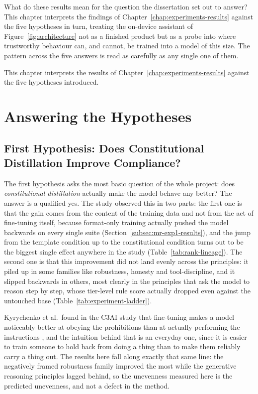 What do these results mean for the question the dissertation set out to answer? This chapter interprets the findings of Chapter~\ref{chap:experiments-results} against the five hypotheses in turn, treating the on-device assistant of Figure~\ref{fig:architecture} not as a finished product but as a probe into where trustworthy behaviour can, and cannot, be trained into a model of this size. The pattern across the five answers is read as carefully as any single one of them.

This chapter interprets the results of Chapter~\ref{chap:experiments-results} against the five hypotheses introduced.

\section{Answering the Hypotheses}
\label{sec:answering-hypotheses}

\subsection{First Hypothesis: Does Constitutional Distillation Improve Compliance?}
\label{subsec:h1-constitutional-distillation}

The first hypothesis asks the most basic question of the whole project: does \emph{constitutional distillation} actually make the model behave any better? The answer is a qualified yes. The study observed this in two parts: the first one is that the gain comes from the content of the training data and not from the act of fine-tuning itself, because format-only training actually pushed the model backwards on every single suite (Section~\ref{subsec:mr-exp1-results}), and the jump from the template condition up to the constitutional condition turns out to be the biggest single effect anywhere in the study (Table~\ref{tab:rank-lineage}). The second one is that this improvement did not land evenly across the principles: it piled up in some families like robustness, honesty and tool-discipline, and it slipped backwards in others, most clearly in the principles that ask the model to reason step by step, whose tier-level rule score actually dropped even against the untouched base (Table~\ref{tab:experiment-ladder}). 

Kyrychenko et al.\ found in the C3AI study that fine-tuning makes a model noticeably better at obeying the prohibitions than at actually performing the instructions \cite{kyrychenko2025c3aicraftingevaluatingconstitutions}, and the intuition behind that is an everyday one, since it is easier to train someone to hold back from doing a thing than to make them reliably carry a thing out. The results here fall along exactly that same line: the negatively framed robustness family improved the most while the generative reasoning principles lagged behind, so the unevenness measured here is the predicted unevenness, and not a defect in the method.


